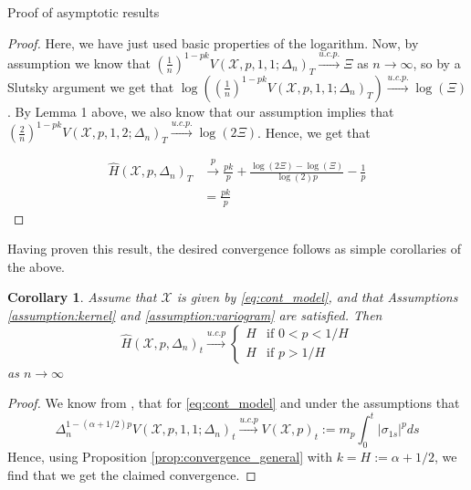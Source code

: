 \documentclass[fleqn,11pt,letterpaper]{article}
\theoremstyle{plain}
\newtheorem{corollary}{Corollary}[section]
\theoremstyle{definition}
\theoremstyle{remark}
\numberwithin{equation}{section}
\begin{document}
\begin{section}{Proof of asymptotic results}
\begin{proof}
Here, we have just used basic properties of the logarithm. Now, by assumption we know that $\left(\frac{1}{n}\right)^{1-pk}V(\mathcal{X},p,1,1;\Delta_n)_T\overset{u.c.p.}{\to}\Xi$ as $n\to\infty$, so by a Slutsky argument we get that $\log(\left(\frac{1}{n}\right)^{1-pk}V(\mathcal{X},p,1,1;\Delta_n)_T)\overset{u.c.p.}{\to}\log(\Xi)$. By Lemma 1 above, we also know that our assumption implies that $\left(\frac{2}{n}\right)^{1-pk}V(\mathcal{X},p,1,2;\Delta_n)_T\overset{u.c.p.}{\to}\log(2\Xi)$. Hence, we get that 


\begin{equation}
    \begin{split}
                \hat{H}(\mathcal{X},p,\Delta_n)_T &\overset{p}{\to} \frac{pk}{p} + \frac{\log(2\Xi) - \log(\Xi)}{\log(2)p} - \frac{1}{p} \\
        &= \frac{pk}{p}
    \end{split}
\end{equation}
\end{proof}

Having proven this result, the desired convergence follows as simple corollaries of the above. 

\begin{corollary}
    Assume that $\mathcal{X}$ is given by \eqref{eq:cont_model}, and that Assumptions \ref{assumption:kernel} and \ref{assumption:variogram} are satisfied. Then 
    \begin{equation}
        \hat{H}(\mathcal{X},p,\Delta_n)_t \overset{u.c.p}{\to}\begin{cases}
    H & \text{if }0<p<1/H\\
    H & \text{if }p>1/H
    \end{cases}
    \end{equation}
    as $n\to\infty$
\end{corollary}

\begin{proof}
    We know from \cite{Corcuera2013}, that for \eqref{eq:cont_model} and under the assumptions that 
    \begin{equation}\label{eq:cont_power_var_conv}
        \Delta_n^{1-(\alpha+1/2)p}V(\mathcal{X},p,1,1;\Delta_n)_t\overset{u.c.p}{\longrightarrow}V(\mathcal{X},p)_t:=m_p\int_0^t\vert \sigma_{1s}\vert^pds
    \end{equation}
    Hence, using Proposition \ref{prop:convergence_general} with $k=H:=\alpha+1/2$, we find that we get the claimed convergence.
\end{proof}


\end{section}
\end{document}

